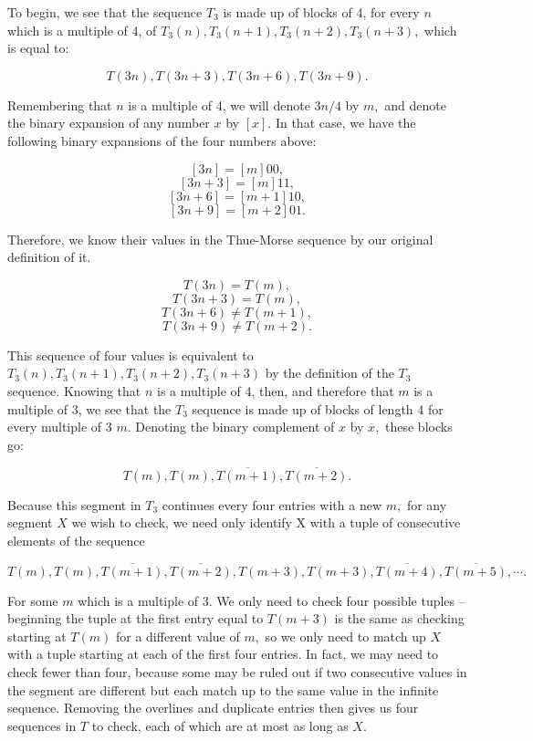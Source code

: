 \documentclass{article}
\begin{document}
To begin, we see that the sequence $T_3$ is made up of blocks of 4, for every $n$ which is a multiple of 4, of $T_3(n), T_3(n+1), T_3(n+2), T_3(n+3),$ which is equal to:

$$T(3n), T(3n+3), T(3n+6), T(3n+9).$$

 Remembering that $n$ is a multiple of 4, we will denote $3n/4$ by $m,$ and denote the binary expansion of any number $x$ by $[x].$ In that case, we have the following binary expansions of the four numbers above:

$$[3n] = [m]00,$$
$$[3n + 3] = [m]11,$$
$$[3n + 6] = [m+1]10,$$
$$[3n + 9] = [m+2]01.$$

Therefore, we know their values in the Thue-Morse sequence by our original definition of it.

$$T(3n) = T(m),$$
$$T(3n + 3) = T(m),$$
$$T(3n + 6) \neq T(m+1),$$
$$T(3n + 9) \neq T(m+2).$$

This sequence of four values is equivalent to $T_3(n), T_3(n+1), T_3(n+2), T_3(n+3)$ by the definition of the $T_3$ sequence. Knowing that $n$ is a multiple of 4, then, and therefore that $m$ is a multiple of 3, we see that the $T_3$ sequence is made up of blocks of length 4 for every multiple of 3 $m.$ Denoting the binary complement of $x$ by $\overline{x},$ these blocks go:

\begin{equation}
T(m), T(m), \overline{T(m+1)}, \overline{T(m+2)}.
\end{equation}

Because this segment in $T_3$ continues every four entries with a new $m,$ for any segment $X$ we wish to check, we need only identify X with a tuple of consecutive elements of the sequence

\begin{equation}
T(m), T(m), \overline{T(m+1)}, \overline{T(m+2)}, T(m+3), T(m+3), \overline{T(m+4)}, \overline{T(m+5)}, \cdots .
\end{equation}

For some $m$ which is a multiple of 3. We only need to check four possible tuples -- beginning the tuple at the first entry equal to $T(m+3)$ is the same as checking starting at $T(m)$ for a different value of $m,$ so we only need to match up $X$ with a tuple starting at each of the first four entries. In fact, we may need to check fewer than four, because some may be ruled out if two consecutive values in the segment are different but each match up to the same value in the infinite sequence. Removing the overlines and duplicate entries then gives us four sequences in $T$ to check, each of which are at most as long as $X.$
\end{document}

